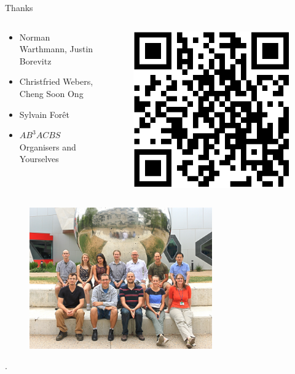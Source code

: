 \documentclass[t]{beamer}
\begin{document}
\begin{frame}{Thanks}
  \begin{columns}
    \begin{column}{0.7\textwidth}
      \begin{itemize}
        \item Norman Warthmann, Justin Borevitz
        \item Christfried Webers, Cheng Soon Ong
        \item Sylvain For\^{e}t
        \item $AB^3ACBS$ Organisers and Yourselves
      \end{itemize}
    \end{column}
    \begin{column}{0.2\textwidth}
      \begin{figure}
        \centering
        \includegraphics[width=\textwidth]{img/link.png}
      \end{figure}
    \end{column}
  \end{columns}
  \begin{figure}
    \centering
    \includegraphics[width=0.7\textwidth]{img/lab.jpg}
  \end{figure}
\end{frame}

\begin{frame}[shrink=50]{}
  \printbibliography
  \vfill
  .
\end{frame}
\end{document}
